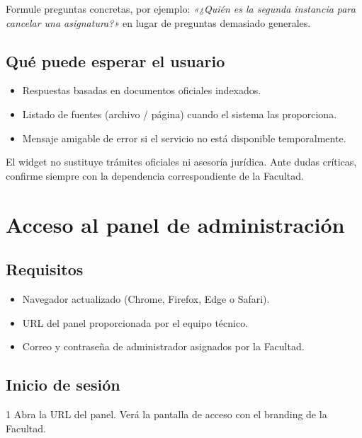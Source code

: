 \documentclass[11pt, a4paper, oneside]{report}
\begin{document}
\begin{tipobox}
  Formule preguntas concretas, por ejemplo:
  \textit{«¿Quién es la segunda instancia para cancelar una asignatura?»}
  en lugar de preguntas demasiado generales.
\end{tipobox}

\section{Qué puede esperar el usuario}
\begin{itemize}
  \item Respuestas basadas en documentos oficiales indexados.
  \item Listado de fuentes (archivo / página) cuando el sistema las proporciona.
  \item Mensaje amigable de error si el servicio no está disponible temporalmente.
\end{itemize}

\begin{advertenciabox}
  El widget no sustituye trámites oficiales ni asesoría jurídica. Ante dudas
  críticas, confirme siempre con la dependencia correspondiente de la Facultad.
\end{advertenciabox}

\chapter{Acceso al panel de administración}

\section{Requisitos}
\begin{itemize}
  \item Navegador actualizado (Chrome, Firefox, Edge o Safari).
  \item URL del panel proporcionada por el equipo técnico.
  \item Correo y contraseña de administrador asignados por la Facultad.
\end{itemize}

\section{Inicio de sesión}

\begin{pasobox}{1}
  Abra la URL del panel. Verá la pantalla de acceso con el branding de la Facultad.
\end{pasobox}
\end{document}

